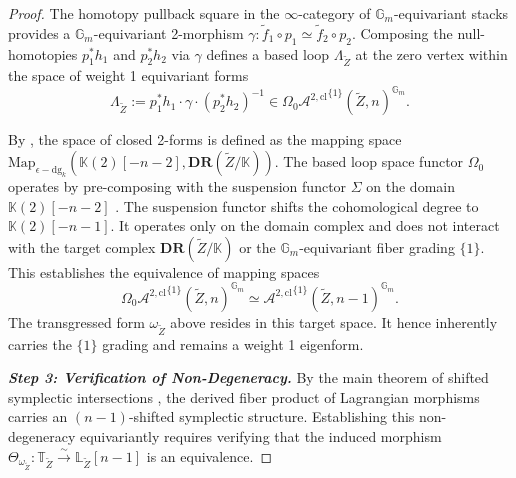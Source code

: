\documentclass[reqno]{amsart}
\theoremstyle{definition}
\theoremstyle{remark}
\newcommand{\LL}{\mathbb{L}}
\newcommand{\TT}{\mathbb{T}}
\newcommand{\Gm}{\mathbb{G}_m}
\newcommand{\K}{\mathbb{K}}
\newcommand{\DR}{\mathbf{DR}}
\newcommand{\Acl}{\mathcal{A}^{2, \mathrm{cl}}}
\begin{document}
{\begin{proof}
  The homotopy pullback square in the $\infty$-category of $\Gm$-equivariant stacks provides a $\Gm$-equivariant 2-morphism $\gamma \colon \widetilde{f}_1 \circ p_1 \simeq \widetilde{f}_2 \circ p_2$. Composing the null-homotopies $p_1^*h_1$ and $p_2^*h_2$ via $\gamma$ defines a based loop $\Lambda_{\widetilde{Z}}$ at the zero vertex within the space of weight 1 equivariant forms
  \begin{equation*}
    \Lambda_{\widetilde{Z}} := p_1^*h_1 \cdot \gamma \cdot (p_2^*h_2)^{-1} \in \Omega_0 {\Acl}^{\{1\}}(\widetilde{Z}, n)^{\Gm}.
  \end{equation*}

  By \cite[Definition 1.8]{PTVV}, the space of closed 2-forms is defined as the mapping space $\mathrm{Map}_{\epsilon-\mathrm{dg}_k}(\K(2)[-n-2], \DR(\widetilde{Z}/\K))$. The based loop space functor $\Omega_0$ operates by pre-composing with the suspension functor $\Sigma$ on the domain $\K(2)[-n-2]$ \cite[Section 1.1.2]{LurieHA}. The suspension functor shifts the cohomological degree to $\K(2)[-n-1]$. It operates only on the domain complex and does not interact with the target complex $\DR(\widetilde{Z}/\K)$ or the $\Gm$-equivariant fiber grading $\{1\}$. This establishes the equivalence of mapping spaces
  \begin{equation*}
    \Omega_0 {\Acl}^{\{1\}}(\widetilde{Z}, n)^{\Gm} \simeq {\Acl}^{\{1\}}(\widetilde{Z}, n-1)^{\Gm}.
  \end{equation*}
The transgressed form $\omega_{\widetilde{Z}}$ above resides in this target space. It hence inherently carries the $\{1\}$ grading and remains a weight 1 eigenform.

  \vspace{5pt}

  \textbf{\textit{Step 3: Verification of Non-Degeneracy.}}
  By the main theorem of shifted symplectic intersections \cite[Theorem 2.9]{PTVV}, the derived fiber product of Lagrangian morphisms carries an $(n-1)$-shifted symplectic structure. Establishing this non-degeneracy equivariantly requires verifying that the induced morphism $\Theta_{\omega_{\widetilde{Z}}} \colon \TT_{\widetilde{Z}} \xrightarrow{\sim} \LL_{\widetilde{Z}}[n-1]$ is an equivalence. 
  

\end{proof}}
\end{document}

